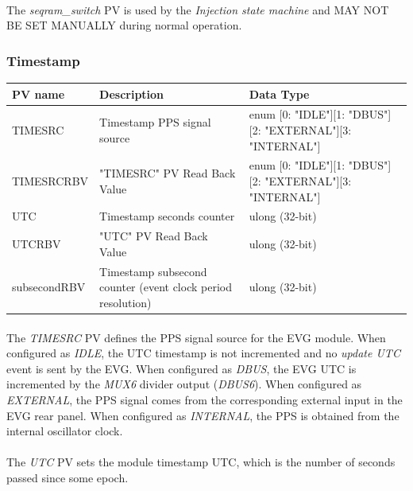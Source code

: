 \documentclass[openany]{article}
\begin{document}
			\paragraph{} The \emph{seqram\_switch} PV is used by the \emph{Injection state machine} and MAY NOT BE SET MANUALLY during normal operation.

		\subsubsection{Timestamp}\label{pvgroup:evg-timestamp}
			\begin{center}
			\begin{tabular}{| m{2.8cm} m{6cm} m{6cm} |}
			    \hline
			    \bfseries PV name & \bfseries Description & \bfseries Data Type \\ \hline
			    TIMESRC & Timestamp PPS signal source & enum [0: "IDLE"][1: "DBUS"][2: "EXTERNAL"][3: "INTERNAL"] \\ \hline
			    TIMESRCRBV & "TIMESRC" PV Read Back Value & enum [0: "IDLE"][1: "DBUS"][2: "EXTERNAL"][3: "INTERNAL"] \\ \hline
			    UTC & Timestamp seconds counter & ulong (32-bit) \\ \hline
			    UTCRBV & "UTC" PV Read Back Value & ulong (32-bit) \\ \hline
			    subsecondRBV & Timestamp subsecond counter (event clock period resolution) & ulong (32-bit) \\ \hline
			\end{tabular}
			\end{center}

			\paragraph{} The \emph{TIMESRC} PV defines the PPS signal source for the EVG module. When configured as \emph{IDLE}, the UTC timestamp is not incremented and no \emph{update UTC} event is sent by the EVG. When configured as \emph{DBUS}, the EVG UTC is incremented by the \emph{MUX6} divider output (\emph{DBUS6}). When configured as \emph{EXTERNAL}, the PPS signal comes from the corresponding external input in the EVG rear panel. When configured as \emph{INTERNAL}, the PPS is obtained from the internal oscillator clock.
			\paragraph{} The \emph{UTC} PV sets the module timestamp UTC, which is the number of seconds passed since some epoch.
\end{document}
